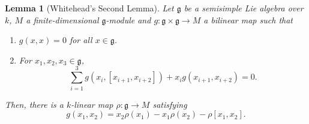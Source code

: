 \documentclass[12pt]{article}
\theoremstyle{thmstyle}
\newtheorem{lemma}[theorem]{Lemma}
\theoremstyle{defstyle}
\newcommand{\frakg}{\mathfrak{g}}
\begin{document}
\begin{lemma}[Whitehead's Second Lemma]
    Let $\frakg$ be a semisimple Lie algebra over $k$, $M$ a finite-dimensional $\frakg$-module and $g:\frakg\times\frakg\to M$ a bilinear map such that 
    \begin{enumerate}[label=(\alph*)]
        \item $g(x, x) = 0$ for all $x\in\frakg$.
        \item For $x_1,x_2,x_3\in\frakg$, 
        \begin{equation*}
            \sum_{i = 1}^3 g(x_{i}, [x_{i + 1}, x_{i + 2}]) + x_ig(x_{i + 1}, x_{i + 2}) = 0.
        \end{equation*}
    \end{enumerate}
    Then, there is a $k$-linear map $\rho: \frakg\to M$ satisfying 
    \begin{equation*}
        g(x_1, x_2) = x_2\rho(x_1) - x_1\rho(x_2) - \rho[x_1,x_2].
    \end{equation*}
\end{lemma}
\end{document}
